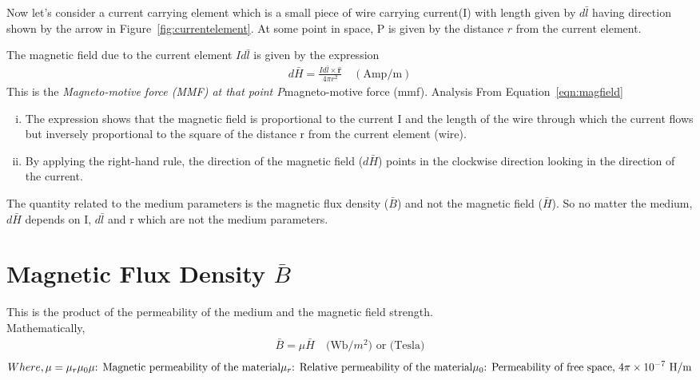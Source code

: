 Now let's consider a current carrying element which is a small piece of wire carrying current(I) with length given by $d\bar{l}$ having direction shown by the arrow in Figure~\ref{fig:currentelement}. At some point in space, P is given by the distance $r$ from the current element.

The magnetic field due to the current element $Id\bar{l}$ is given by the expression
\begin{align}
\boxed{d\bar{H}= \frac{Id\bar{l} \times \hat{\textbf{r}}}{4\pi r^{2}}}\quad (\text{Amp/m})
\label{eqn:magfield}
\end{align} 
This is the \emph{Magneto-motive force (MMF) at that point P}magneto-motive force (mmf). Analysis From Equation~\eqref{eqn:magfield}
\begin{enumerate}[(i)]
\item The expression shows that the magnetic field is proportional to the current I and the length of the wire through which the current flows but inversely proportional to the square of the distance r from the current element (wire).
\item By applying the right-hand rule, the direction of the magnetic field ($d\bar{H}$) points in the clockwise direction looking in the direction of the current.
\end{enumerate}

The quantity related to the medium parameters is the magnetic flux density ($\bar{B}$) and not the magnetic field ($\bar{H}$). So no matter the medium, $ d\bar{H} $ depends on I, $ d\bar{l} $ and r which are not the medium parameters. 

\section{Magnetic Flux Density $\bar{B}$}
This is the product of the permeability of the medium and the magnetic field strength.\\
Mathematically, 
\begin{align}
\boxed{\bar{B} = \mu\bar{H}}\quad\text{(Wb/$m^{2}$) or (Tesla)}
\label{eqn:magflux}
\end{align}
\begin{dmath*}
Where, \newline
\mu = \mu_r\mu_0\newline
\text{$\mu$: Magnetic permeability of the material} \newline
\text{$\mu_r$: Relative permeability of the material} \newline
\text{$\mu_0$: Permeability of free space, $4\pi\times10^{-7}$ H/m}
\end{dmath*}

